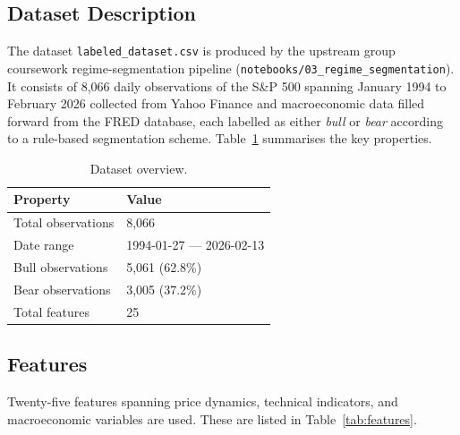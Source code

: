\documentclass[12pt]{article}
\begin{document}
\subsection{Dataset Description}

The dataset \texttt{labeled\_dataset.csv} is produced by the upstream group coursework regime-segmentation
pipeline (\texttt{notebooks/03\_regime\_segmentation}).
It consists of 8,066 daily observations of the S\&P 500 spanning January 1994 to
February 2026 collected from Yahoo Finance and macroeconomic data filled forward from the FRED database, each labelled as either \textit{bull} or \textit{bear}
according to a rule-based segmentation scheme.
Table~\ref{tab:dataset-summary} summarises the key properties.

\begin{table}[H]
\centering
\caption{Dataset overview.}
\label{tab:dataset-summary}
\begin{tabular}{ll}
\toprule
Property & Value \\
\midrule
Total observations & 8,066 \\
Date range & 1994-01-27 --- 2026-02-13 \\
Bull observations & 5,061 (62.8\%) \\
Bear observations & 3,005 (37.2\%) \\
Total features & 25 \\
\bottomrule
\end{tabular}
\end{table}

\subsection{Features}

Twenty-five features spanning price dynamics, technical indicators, and
macroeconomic variables are used.
These are listed in Table~\ref{tab:features}.
\end{document}
